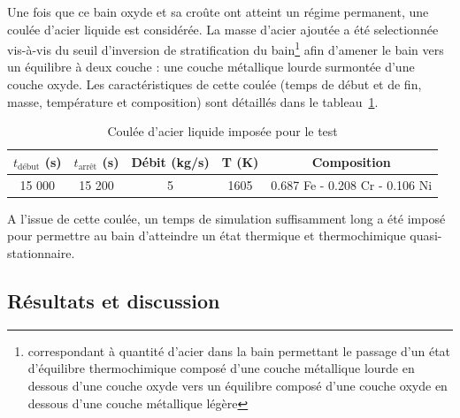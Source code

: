 Une fois que ce bain oxyde et sa croûte ont atteint un régime permanent, une coulée d'acier liquide est considérée. La masse d'acier ajoutée a été selectionnée vis-à-vis du seuil d'inversion de stratification du bain\footnote{correspondant à quantité d'acier dans la bain permettant le passage d'un état d'équilibre thermochimique composé d'une couche métallique lourde en dessous d'une couche oxyde vers un équilibre composé d'une couche oxyde en dessous d'une couche métallique légère} afin d'amener le bain vers un équilibre à deux couche : une couche métallique lourde surmontée d'une couche oxyde. Les caractéristiques de cette coulée (temps de début et de fin, masse, température et composition) sont détaillés dans le tableau~\ref{tab:coulees_acier}. 
\begin{table}
	\centering
	\begin{tabular}{ccccc} 
	\hline
	$t_{\text{début}}$ (s) &  $t_{\text{arrêt}}$ (s) & Débit (kg/s) & T (K) & Composition\\
	\hline
	15 000 & 15 200 & 5 & 1605 & 0.687 Fe - 0.208 Cr - 0.106 Ni\\
	\hline
	\end{tabular}	
	\caption{Coulée d'acier liquide imposée pour le test} 
	\label{tab:coulees_acier}
\end{table}
A l'issue de cette coulée, un temps de simulation suffisamment long a été imposé pour permettre au bain d'atteindre un état thermique et thermochimique quasi-stationnaire. 

\subsection{Résultats et discussion}


